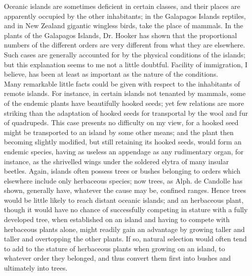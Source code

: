 \indent Oceanic islands are sometimes deficient in certain classes, and their places are apparently occupied by the other inhabitants; in the Galapagos Islands reptiles, and in New Zealand gigantic wingless birds, take the place of mammals. In the plants of the Galapagos Islands, Dr. Hooker has shown that the proportional numbers of the different orders are very different from what they are elsewhere. Such cases are generally accounted for by the physical conditions of the islands; but this explanation seems to me not a little doubtful. Facility of immigration, I believe, has been at least as important as the nature of the conditions.~\\
\indent Many remarkable little facts could be given with respect to the inhabitants of remote islands. For instance, in certain islands not tenanted by mammals, some of the endemic plants have beautifully hooked seeds; yet few relations are more striking than the adaptation of hooked seeds for transportal by the wool and fur of quadrupeds. This case presents no difficulty on my view, for a hooked seed might be transported to an island by some other means; and the plant then becoming slightly modified, but still retaining its hooked seeds, would form an endemic species, having as useless an appendage as any rudimentary organ, for instance, as the shrivelled wings under the soldered elytra of many insular beetles. Again, islands often possess trees or bushes belonging to orders which elsewhere include only herbaceous species; now trees, as Alph. de Candolle has shown, generally have, whatever the cause may be, confined ranges. Hence trees would be little likely to reach distant oceanic islands; and an herbaceous plant, though it would have no chance of successfully competing in stature with a fully developed tree, when established on an island and having to compete with herbaceous plants alone, might readily gain an advantage by growing taller and taller and overtopping the other plants. If so, natural selection would often tend to add to the stature of herbaceous plants when growing on an island, to whatever order they belonged, and thus convert them first into bushes and ultimately into trees.~\\
